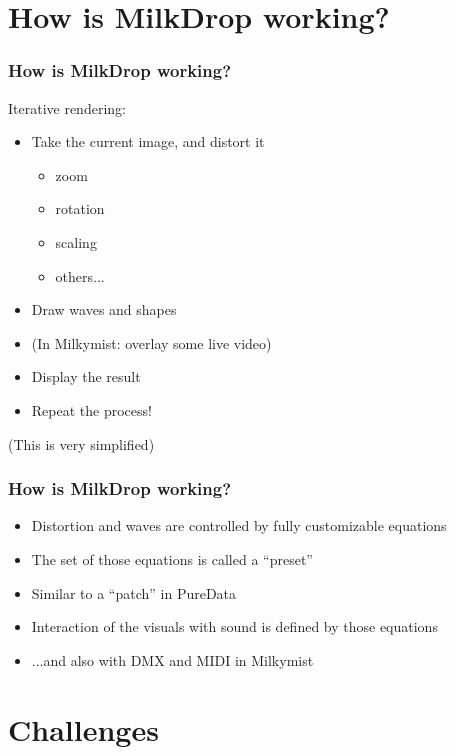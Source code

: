 \documentclass{beamer}
\begin{document}
\section{How is MilkDrop working?}
\frame
{
  \frametitle{How is MilkDrop working?}

Iterative rendering:
  \begin{itemize}
  \item Take the current image, and distort it
  \begin{itemize}
    \item zoom
    \item rotation
    \item scaling
    \item others...
  \end{itemize}
  \item Draw waves and shapes
  \item (In Milkymist: overlay some live video)
  \item Display the result
  \item Repeat the process!
  \end{itemize}
  (This is very simplified)
}

\frame
{
  \frametitle{How is MilkDrop working?}

  \begin{itemize}
  \item Distortion and waves are controlled by fully customizable equations
  \item The set of those equations is called a ``preset''
  \item Similar to a ``patch'' in PureData
  \item Interaction of the visuals with sound is defined by those equations
  \item ...and also with DMX and MIDI in Milkymist
  \end{itemize}
}

\section{Challenges}
\end{document}
